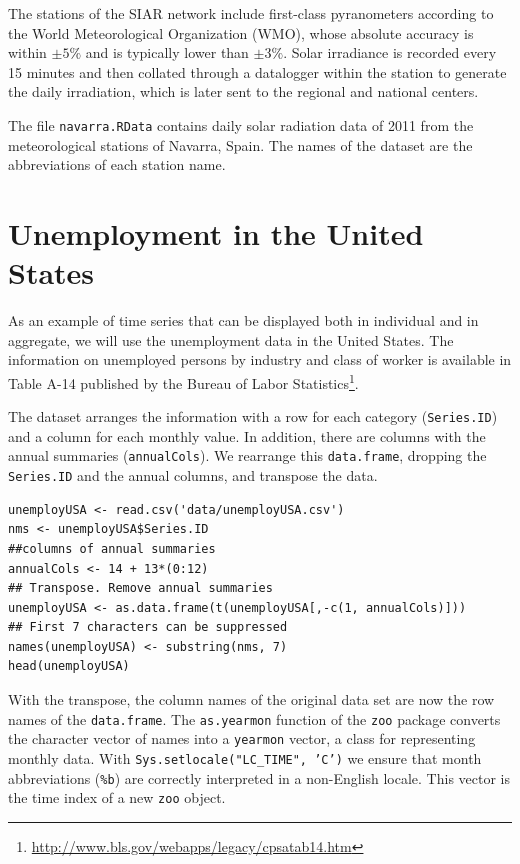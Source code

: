 The stations of the SIAR network include first-class pyranometers
according to the World Meteorological Organization (WMO), whose
absolute accuracy is within $\pm 5\%$ and is typically lower than $\pm
3\%$. Solar irradiance is recorded every 15 minutes and then
collated through a datalogger within the station to generate the daily
irradiation, which is later sent to the regional and national centers.

The file \texttt{navarra.RData} contains daily solar radiation data of 2011
from the meteorological stations of Navarra, Spain. The names of the
dataset are the abbreviations of each station name.

\section{Unemployment in the United States}
\label{sec-2}
As an example of time series that can be displayed both in individual
and in aggregate, we will use the unemployment data in the United
States. The information on unemployed persons by industry and class of
worker is available in Table A-14 published by the Bureau of Labor
Statistics\footnote{\url{http://www.bls.gov/webapps/legacy/cpsatab14.htm}}.

The dataset arranges the information with a row for each category
(\texttt{Series.ID}) and a column for each monthly value. In addition, there
are columns with the annual summaries (\texttt{annualCols}). We rearrange
this \texttt{data.frame}, dropping the \texttt{Series.ID} and the annual columns,
and transpose the data.



\lstset{language=R,numbers=none}
\begin{lstlisting}
unemployUSA <- read.csv('data/unemployUSA.csv')
nms <- unemployUSA$Series.ID
##columns of annual summaries
annualCols <- 14 + 13*(0:12)
## Transpose. Remove annual summaries
unemployUSA <- as.data.frame(t(unemployUSA[,-c(1, annualCols)]))
## First 7 characters can be suppressed
names(unemployUSA) <- substring(nms, 7)
head(unemployUSA)
\end{lstlisting}

With the transpose, the column names of the original data set are
now the row names of the \texttt{data.frame}. The \texttt{as.yearmon} function
of the \texttt{zoo} package converts the character vector of names into a
\texttt{yearmon} vector, a class for representing monthly data. With
\texttt{Sys.setlocale("LC\_TIME", 'C')} we ensure that month abbreviations
(\texttt{\%b}) are correctly interpreted in a non-English locale. This
vector is the time index of a new \texttt{zoo} object. 

